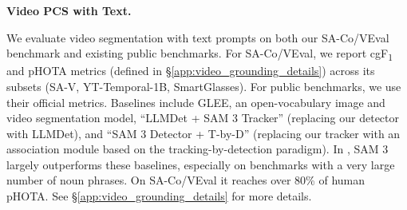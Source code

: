 \documentclass[]{fairmeta}
\newcommand{\dsname}{{SA-Co}\xspace}
\newcommand{\evalvid}{{\dsname/VEval}\xspace}
\newcommand{\cgf}{cgF\textsubscript{1}\xspace}
\renewcommand{\paragraph}[1]{%
	\noindent\textbf{#1.}\noindent\xspace%
}
\begin{document}
	\paragraph{Video PCS with Text} 
	We evaluate video segmentation with text prompts on both our \evalvid benchmark and existing public benchmarks. For \evalvid, we report \cgf and pHOTA metrics (defined in \S\ref{app:video_grounding_details}) across its subsets (SA-V, YT-Temporal-1B, SmartGlasses). For public benchmarks, we use their official metrics. Baselines include GLEE, an open-vocabulary image and video segmentation model, ``LLMDet + SAM 3 Tracker'' (replacing our detector with LLMDet), and ``SAM 3 Detector + T-by-D'' (replacing our tracker with an association module based on the tracking-by-detection paradigm). In , SAM 3 largely outperforms these baselines, especially on benchmarks with a very large number of noun phrases. On \evalvid it reaches over 80\% of human pHOTA. See \S\ref{app:video_grounding_details} for more details.
	
\end{document}
